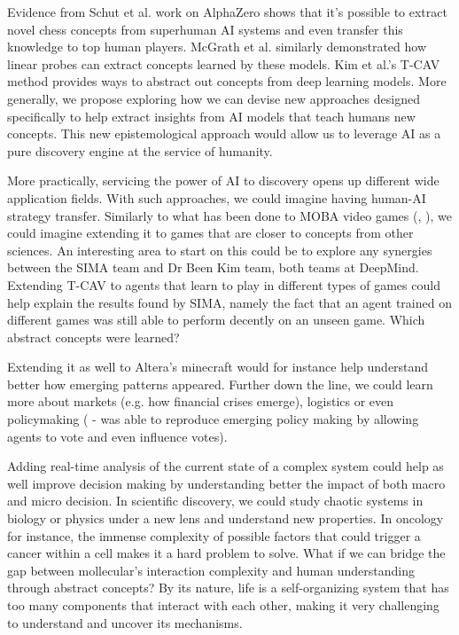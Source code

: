 \documentclass[11pt]{article}
\begin{document}
Evidence from Schut et al. work on AlphaZero \cite{schut} shows that it's possible to extract novel chess concepts from superhuman AI systems and even transfer this knowledge to top human players. McGrath et al. \cite{alphazero-chess} similarly demonstrated how linear probes can extract concepts learned by these models. Kim et al.'s T-CAV \cite{tcav} method provides ways to abstract out concepts from deep learning models. More generally, we propose exploring how we can devise new approaches designed specifically to help extract insights from AI models that teach humans new concepts.
This new epistemological approach would allow us to leverage AI as a pure discovery engine at the service of humanity.

More practically, servicing the power of AI to discovery opens up different wide application fields.
With such approaches, we could imagine having human-AI strategy transfer. Similarly to what has been done to MOBA video games (\cite{openai_five}, \cite{fair_starcraft}), we could imagine extending it to games that are closer to concepts from other sciences.
An interesting area to start on this could be to explore any synergies between the SIMA team \cite{sima} and Dr Been Kim team, both teams at DeepMind. Extending T-CAV to agents that learn to play in different types of games could help explain the results found by SIMA, namely the fact that an agent trained on different games was still able to perform decently on an unseen game. Which abstract concepts were learned?

Extending it as well to Altera's minecraft would for instance help understand better how emerging patterns appeared. Further down the line, we could learn more about markets (e.g. how financial crises emerge), logistics or even policymaking (\cite{altera} - was able to reproduce emerging policy making by allowing agents to vote and even influence votes).

Adding real-time analysis of the current state of a complex system could help as well improve decision making by understanding better the impact of both macro and micro decision.
In scientific discovery, we could study chaotic systems in biology or physics under a new lens and understand new properties. In oncology for instance, the immense complexity of possible factors that could trigger a cancer within a cell makes it a hard problem to solve. What if we can bridge the gap between mollecular's interaction complexity and human understanding through abstract concepts? By its nature, life is a self-organizing system that has too many components that interact with each other, making it very challenging to understand and uncover its mechanisms.
\end{document}
